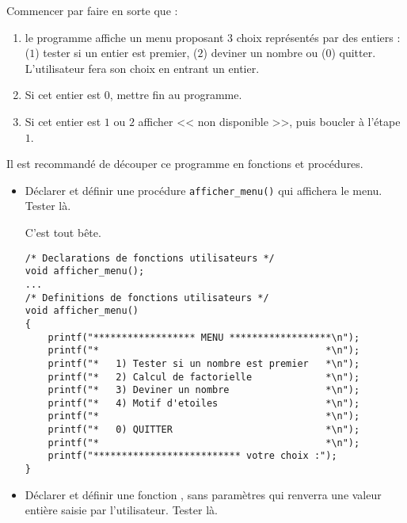 \begin{newenu}
\item Commencer par faire en sorte que   :
  \begin{enumerate}
  \item le programme affiche un menu proposant $3$ choix représentés
    par des entiers : ($1$) tester si un entier est premier, ($2$)
    deviner un nombre ou ($0$) quitter. L'utilisateur fera son choix
    en entrant un entier.
  \item Si cet entier est $0$, mettre fin au programme.
  \item Si cet entier est $1$ ou $2$ afficher <<  non
    disponible >>, puis boucler à l'étape $1$.
  \end{enumerate}


Il est recommandé de découper ce programme en fonctions et procédures.
\begin{itemize}
\item Déclarer et définir une procédure \verb+afficher_menu()+ qui
  affichera le menu. Tester là.
  \begin{correction}
    C'est tout bête.
{\footnotesize
\begin{verbatim}
/* Declarations de fonctions utilisateurs */
void afficher_menu();
...
/* Definitions de fonctions utilisateurs */
void afficher_menu()
{
    printf("****************** MENU ******************\n");
    printf("*                                        *\n");
    printf("*   1) Tester si un nombre est premier   *\n");
    printf("*   2) Calcul de factorielle             *\n");
    printf("*   3) Deviner un nombre                 *\n");
    printf("*   4) Motif d'etoiles                   *\n");
    printf("*                                        *\n");
    printf("*   0) QUITTER                           *\n");
    printf("*                                        *\n");
    printf("************************** votre choix :");
}
\end{verbatim} 
}
\end{correction}

\item Déclarer et définir une fonction , sans
  paramètres qui renverra une valeur entière saisie par
  l'utilisateur. Tester là.


\end{itemize}
\end{newenu}
